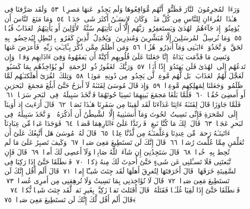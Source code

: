  وَرَءَا ٱلمُجرِمُونَ ٱلنَّارَ فَظَنُّوٓا۟ أَنَّهُم مُّوَاقِعُوهَا وَلَم يَجِدُوا۟ عَنهَا مَصرِفًۭا ﴿٥٣﴾
 وَلَقَد صَرَّفنَا فِى هَـٰذَا ٱلقُرءَانِ لِلنَّاسِ مِن كُلِّ مَثَلٍۢ ۚ وَكَانَ ٱلإِنسَـٰنُ أَكثَرَ شَىءٍۢ جَدَلًۭا ﴿٥٤﴾
 وَمَا مَنَعَ ٱلنَّاسَ أَن يُؤمِنُوٓا۟ إِذ جَآءَهُمُ ٱلهُدَىٰ وَيَستَغفِرُوا۟ رَبَّهُم إِلَّآ أَن تَأتِيَهُم سُنَّةُ ٱلأَوَّلِينَ أَو يَأتِيَهُمُ ٱلعَذَابُ قُبُلًۭا ﴿٥٥﴾
 وَمَا نُرسِلُ ٱلمُرسَلِينَ إِلَّا مُبَشِّرِينَ وَمُنذِرِينَ ۚ وَيُجَٰدِلُ ٱلَّذِينَ كَفَرُوا۟ بِٱلبَٰطِلِ لِيُدحِضُوا۟ بِهِ ٱلحَقَّ ۖ وَٱتَّخَذُوٓا۟ ءَايَـٰتِى وَمَآ أُنذِرُوا۟ هُزُوًۭا ﴿٥٦﴾
 وَمَن أَظلَمُ مِمَّن ذُكِّرَ بِـَٔايَـٰتِ رَبِّهِۦ فَأَعرَضَ عَنهَا وَنَسِىَ مَا قَدَّمَت يَدَاهُ ۚ إِنَّا جَعَلنَا عَلَىٰ قُلُوبِهِم أَكِنَّةً أَن يَفقَهُوهُ وَفِىٓ ءَاذَانِهِم وَقرًۭا ۖ وَإِن تَدعُهُم إِلَى ٱلهُدَىٰ فَلَن يَهتَدُوٓا۟ إِذًا أَبَدًۭا ﴿٥٧﴾
 وَرَبُّكَ ٱلغَفُورُ ذُو ٱلرَّحمَةِ ۖ لَو يُؤَاخِذُهُم بِمَا كَسَبُوا۟ لَعَجَّلَ لَهُمُ ٱلعَذَابَ ۚ بَل لَّهُم مَّوعِدٌۭ لَّن يَجِدُوا۟ مِن دُونِهِۦ مَوئِلًۭا ﴿٥٨﴾
 وَتِلكَ ٱلقُرَىٰٓ أَهلَكنَـٰهُم لَمَّا ظَلَمُوا۟ وَجَعَلنَا لِمَهلِكِهِم مَّوعِدًۭا ﴿٥٩﴾
 وَإِذ قَالَ مُوسَىٰ لِفَتَىٰهُ لَآ أَبرَحُ حَتَّىٰٓ أَبلُغَ مَجمَعَ ٱلبَحرَينِ أَو أَمضِىَ حُقُبًۭا ﴿٦٠﴾
 فَلَمَّا بَلَغَا مَجمَعَ بَينِهِمَا نَسِيَا حُوتَهُمَا فَٱتَّخَذَ سَبِيلَهُۥ فِى ٱلبَحرِ سَرَبًۭا ﴿٦١﴾
 فَلَمَّا جَاوَزَا قَالَ لِفَتَىٰهُ ءَاتِنَا غَدَآءَنَا لَقَد لَقِينَا مِن سَفَرِنَا هَـٰذَا نَصَبًۭا ﴿٦٢﴾
 قَالَ أَرَءَيتَ إِذ أَوَينَآ إِلَى ٱلصَّخرَةِ فَإِنِّى نَسِيتُ ٱلحُوتَ وَمَآ أَنسَىٰنِيهُ إِلَّا ٱلشَّيطَٰنُ أَن أَذكُرَهُۥ ۚ وَٱتَّخَذَ سَبِيلَهُۥ فِى ٱلبَحرِ عَجَبًۭا ﴿٦٣﴾
 قَالَ ذَٟلِكَ مَا كُنَّا نَبغِ ۚ فَٱرتَدَّا عَلَىٰٓ ءَاثَارِهِمَا قَصَصًۭا ﴿٦٤﴾
 فَوَجَدَا عَبدًۭا مِّن عِبَادِنَآ ءَاتَينَـٰهُ رَحمَةًۭ مِّن عِندِنَا وَعَلَّمنَـٰهُ مِن لَّدُنَّا عِلمًۭا ﴿٦٥﴾
 قَالَ لَهُۥ مُوسَىٰ هَل أَتَّبِعُكَ عَلَىٰٓ أَن تُعَلِّمَنِ مِمَّا عُلِّمتَ رُشدًۭا ﴿٦٦﴾
 قَالَ إِنَّكَ لَن تَستَطِيعَ مَعِىَ صَبرًۭا ﴿٦٧﴾
 وَكَيفَ تَصبِرُ عَلَىٰ مَا لَم تُحِط بِهِۦ خُبرًۭا ﴿٦٨﴾
 قَالَ سَتَجِدُنِىٓ إِن شَآءَ ٱللَّهُ صَابِرًۭا وَلَآ أَعصِى لَكَ أَمرًۭا ﴿٦٩﴾
 قَالَ فَإِنِ ٱتَّبَعتَنِى فَلَا تَسـَٔلنِى عَن شَىءٍ حَتَّىٰٓ أُحدِثَ لَكَ مِنهُ ذِكرًۭا ﴿٧٠﴾
 فَٱنطَلَقَا حَتَّىٰٓ إِذَا رَكِبَا فِى ٱلسَّفِينَةِ خَرَقَهَا ۖ قَالَ أَخَرَقتَهَا لِتُغرِقَ أَهلَهَا لَقَد جِئتَ شَيـًٔا إِمرًۭا ﴿٧١﴾
 قَالَ أَلَم أَقُل إِنَّكَ لَن تَستَطِيعَ مَعِىَ صَبرًۭا ﴿٧٢﴾
 قَالَ لَا تُؤَاخِذنِى بِمَا نَسِيتُ وَلَا تُرهِقنِى مِن أَمرِى عُسرًۭا ﴿٧٣﴾
 فَٱنطَلَقَا حَتَّىٰٓ إِذَا لَقِيَا غُلَـٰمًۭا فَقَتَلَهُۥ قَالَ أَقَتَلتَ نَفسًۭا زَكِيَّةًۢ بِغَيرِ نَفسٍۢ لَّقَد جِئتَ شَيـًۭٔا نُّكرًۭا ﴿٧٤﴾
 ۞ قَالَ أَلَم أَقُل لَّكَ إِنَّكَ لَن تَستَطِيعَ مَعِىَ صَبرًۭا ﴿٧٥﴾
